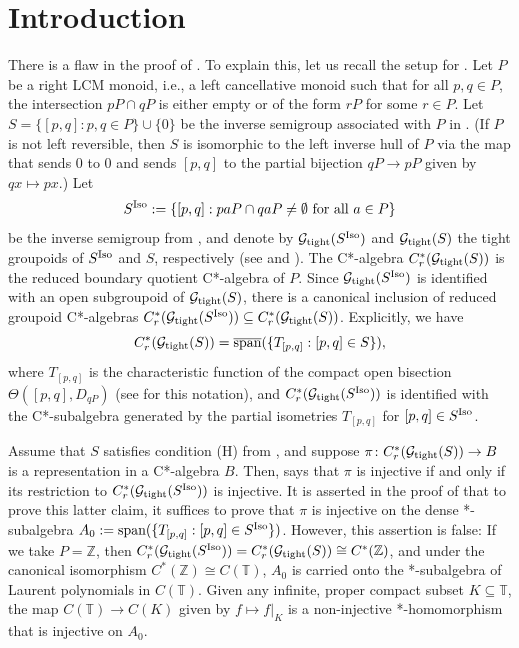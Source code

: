 \documentclass[12pt]{amsart}
\theoremstyle{definition}
\theoremstyle{remark}
\numberwithin{equation}{section}
\newcommand{\Zz}{\mathbb{Z}}
\newcommand{\Tz}{\mathbb{T}}
\newcommand{\cG}{\mathcal{G}}
\newcommand{\tight}{\textup{tight}}
\newcommand{\Iso}{\textup{Iso}}
\begin{document}
\section{Introduction}
\label{Intro}
There is a flaw in the proof of \cite[Theorem~4.1]{St22}. To explain this, let us recall the setup for \cite[Theorem~4.1]{St22}. Let $P$ be a right LCM monoid, i.e., a left cancellative monoid such that for all $p,q\in P$, the intersection $pP\cap qP$ is either empty or of the form $rP$ for some $r\in P$. Let $S=\{[p,q] : p,q\in P\}\cup\{0\}$ be the inverse semigroup associated with $P$ in \cite[Proposition~3.2]{StLCM}. 
(If $P$ is not left reversible, then $S$ is isomorphic to the left inverse hull of $P$ via the map that sends $0$ to $0$ and sends $[p,q]$ to the partial bijection $qP\to pP$ given by $qx\mapsto px$.) 
Let
\[
S^{\Iso}:=\{[p,q] :paP\cap qaP\neq\emptyset\text{ for all }a\in P\}
\]
be the inverse semigroup from \cite[Section~4]{St22}, and denote by $\cG_{\tight}(S^\Iso)$ and $\cG_{\tight}(S)$ the tight groupoids of $S^\Iso$ and $S$, respectively (see \cite{Ex08} and \cite{EP}). The C*-algebra $C_r^*(\cG_{\tight}(S))$ is the reduced boundary quotient C*-algebra of $P$. Since $\cG_{\tight}(S^\Iso)$ is identified with an open subgroupoid of $\cG_{\tight}(S)$, there is a canonical inclusion of reduced groupoid C*-algebras $C_r^*(\cG_{\tight}(S^\Iso))\subseteq C_r^*(\cG_{\tight}(S))$. Explicitly, we have 
\[
C_r^*(\cG_{\tight}(S))=\overline{\textup{span}}(\{T_{[p,q]} : [p,q]\in S\}),
\]
where $T_{[p,q]}$ is the characteristic function of the compact open bisection $\Theta([p,q],D_{qP})$ (see \cite[Section~3]{St22} for this notation), and $C_r^*(\cG_{\tight}(S^\Iso))$ is identified with the C*-subalgebra generated by the partial isometries $T_{[p,q]}$ for $[p,q]\in S^\Iso$.

Assume that $S$ satisfies condition (H) from \cite[Definition~3.1]{St22}, and suppose $\pi\colon C_r^*(\cG_{\tight}(S))\to B$ is a representation in a C*-algebra $B$. Then, \cite[Theorem~3.4]{St22} says that $\pi$ is injective if and only if its restriction to $C_r^*(\cG_{\tight}(S^\Iso))$ is injective. It is asserted in the proof of \cite[Theorem~4.1]{St22} that to prove this latter claim, it suffices to prove that $\pi$ is injective on the dense *-subalgebra $A_0:=\textup{span}(\{T_{[p,q]} : [p,q]\in S^\Iso\})$. However, this assertion is false: If we take $P=\Zz$, then $C_r^*(\cG_{\tight}(S^\Iso))=C_r^*(\cG_{\tight}(S))\cong C^*(\Zz)$, and under the canonical isomorphism $C^*(\Zz)\cong C(\Tz)$, $A_0$ is carried onto the *-subalgebra of Laurent polynomials in $C(\Tz)$. Given any infinite, proper compact subset $K\subseteq \Tz$, the map $C(\Tz)\to C(K)$ given by $f\mapsto f\vert_K$ is a non-injective *-homomorphism that is injective on $A_0$.
\end{document}
